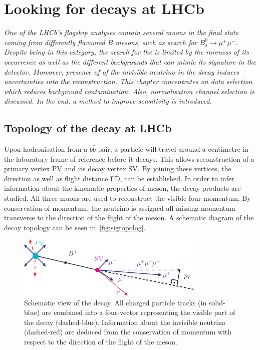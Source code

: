\chapter{Looking for \mb{\Bmumumu} decays at LHCb}
\label{chap:sel}

\textit{One of the LHCb's flagship analyses contain several muons in the final state coming from differently flavoured $B$ mesons, such as search for $B_{s}^{0}\rightarrow \mu^{+} \mu^{-}$. Despite being in this category, the search for the \Bmumumu is limited by the rareness of its occurrence as well as the different backgrounds that can mimic its signature in the detector. Moreover, presence of of the invisible neutrino in the decay induces uncertainties into the reconstruction. This chapter concentrates on data selection which reduces background contamination. Also, normalisation channel selection is discussed. In the end, a method to improve sensitivity is introduced.}



\section{Topology of the \mb{\Bmumumu} decay at LHCb}

Upon hadronisation from a $b\bar{b}$ pair, a \Bpm particle will travel around a centimetre in the laboratory frame of reference before it decays. This allows reconstruction of a primary vertex \gls{PV} and its decay vertex \gls{SV}. By joining these vertices, the direction as well as flight distance \gls{FD}, can be established. In order to infer information about the kinematic properties of \Bpm meson, the decay products are studied. All three muons are used to reconstruct the visible four-momentum. By conservation of momentum, %
the neutrino is assigned all missing momentum transverse to the direction of the flight of the \Bpm meson. A schematic diagram of the decay topology can be seen in~\autoref{fig:sigtopolog}.

\begin{figure}[!h]
	\centering
	\includegraphics[width = 0.8\textwidth]{figs/sel/DecReco_fin.eps}
	\caption{Schematic view of the \Bmumumu decay. All charged particle tracks (in solid-blue) are combined into a four-vector representing the visible part of the decay (dashed-blue). Information about the invisible neutrino (dashed-red) are deduced from the conservation of momentum with respect to the direction of the flight of the \Bpm meson.}%
	\label{fig:sigtopolog}
\end{figure}

